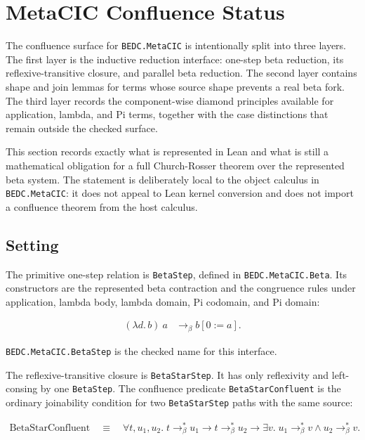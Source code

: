 \section{MetaCIC Confluence Status}\label{sec:self-comp-metatheory-confluence}

The confluence surface for \texttt{BEDC.MetaCIC} is intentionally split into
three layers. The first layer is the inductive reduction interface: one-step
beta reduction, its reflexive-transitive closure, and parallel beta reduction.
The second layer contains shape and join lemmas for terms whose source shape
prevents a real beta fork. The third layer records the component-wise diamond
principles available for application, lambda, and Pi terms, together with the
case distinctions that remain outside the checked surface.

This section records exactly what is represented in Lean and what is still a
mathematical obligation for a full Church-Rosser theorem over the represented
beta system. The statement is deliberately local to the object calculus in
\texttt{BEDC.MetaCIC}: it does not appeal to Lean kernel conversion and does
not import a confluence theorem from the host calculus.

\subsection{Setting}
\label{subsec:metacic-confluence-setting}

The primitive one-step relation is \texttt{BetaStep}, defined in
\texttt{BEDC.MetaCIC.Beta}. Its constructors are the represented beta
contraction and the congruence rules under application, lambda body, lambda
domain, Pi codomain, and Pi domain:

$$
\begin{aligned}
(\lambda d.\,b)\ a &\longrightarrow_\beta b[0 := a].
\end{aligned}
$$

\texttt{BEDC.MetaCIC.BetaStep} is the checked name for this interface.

The reflexive-transitive closure is \texttt{BetaStarStep}. It has only
reflexivity and left-consing by one \texttt{BetaStep}. The confluence predicate
\texttt{BetaStarConfluent} is the ordinary joinability condition for two
\texttt{BetaStarStep} paths with the same source:

$$
\begin{aligned}
\mathrm{BetaStarConfluent}
\quad\equiv\quad
\forall t,u_1,u_2.\;
t \longrightarrow_\beta^\ast u_1
\to t \longrightarrow_\beta^\ast u_2
\to \exists v.\;
u_1 \longrightarrow_\beta^\ast v
\land
u_2 \longrightarrow_\beta^\ast v .
\end{aligned}
$$

